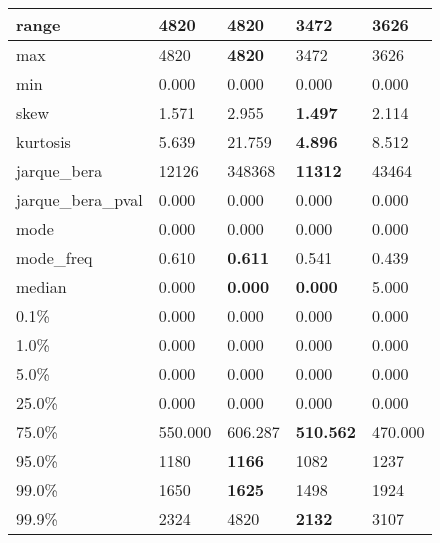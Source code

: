 \begin{table}[H]
\begin{tabular}{|l|m{10em}|m{10em}|m{10em}|m{10em}|}
\hline range & 4820 & \bfseries 4820 & \cellcolor[rgb]{0.9, 0.54, 0.52} 3472 & 3626 \\
\hline max & 4820 & \bfseries 4820 & \cellcolor[rgb]{0.9, 0.54, 0.52} 3472 & 3626 \\
\hline min & 0.000 & 0.000 & 0.000 & 0.000 \\
\hline skew & 1.571 & \cellcolor[rgb]{0.9, 0.54, 0.52} 2.955 & \bfseries 1.497 & 2.114 \\
\hline kurtosis & 5.639 & \cellcolor[rgb]{0.9, 0.54, 0.52} 21.759 & \bfseries 4.896 & 8.512 \\
\hline jarque\_bera & 12126 & \cellcolor[rgb]{0.9, 0.54, 0.52} 348368 & \bfseries 11312 & 43464 \\
\hline jarque\_bera\_pval & 0.000 & 0.000 & 0.000 & 0.000 \\
\hline mode & 0.000 & 0.000 & 0.000 & 0.000 \\
\hline mode\_freq & 0.610 & \bfseries 0.611 & 0.541 & \cellcolor[rgb]{0.9, 0.54, 0.52} 0.439 \\
\hline median & 0.000 & \bfseries 0.000 & \bfseries 0.000 & \cellcolor[rgb]{0.9, 0.54, 0.52} 5.000 \\
\hline 0.1\% & 0.000 & 0.000 & 0.000 & 0.000 \\
\hline 1.0\% & 0.000 & 0.000 & 0.000 & 0.000 \\
\hline 5.0\% & 0.000 & 0.000 & 0.000 & 0.000 \\
\hline 25.0\% & 0.000 & 0.000 & 0.000 & 0.000 \\
\hline 75.0\% & 550.000 & 606.287 & \bfseries 510.562 & \cellcolor[rgb]{0.9, 0.54, 0.52} 470.000 \\
\hline 95.0\% & 1180 & \bfseries 1166 & \cellcolor[rgb]{0.9, 0.54, 0.52} 1082 & 1237 \\
\hline 99.0\% & 1650 & \bfseries 1625 & 1498 & \cellcolor[rgb]{0.9, 0.54, 0.52} 1924 \\
\hline 99.9\% & 2324 & \cellcolor[rgb]{0.9, 0.54, 0.52} 4820 & \bfseries 2132 & 3107 \\
\hline
\end{tabular}
\end{table}
